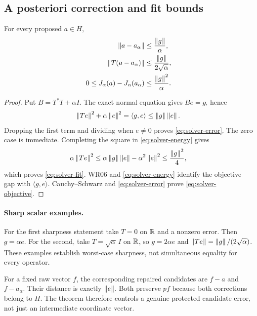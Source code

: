 \subsection{A posteriori correction and fit bounds}
\begin{theorem}\label{WR13}
For every proposed $a\in H$,
\begin{align}
 \left\lVert a-a_\alpha\right\rVert&\le\frac{\left\lVert g\right\rVert}{\alpha},\label{eq:solver-error}\\
 \left\lVert T(a-a_\alpha)\right\rVert&\le\frac{\left\lVert g\right\rVert}{2\sqrt\alpha},\label{eq:solver-fit}\\
 0\le J_\alpha(a)-J_\alpha(a_\alpha)&\le\frac{\left\lVert g\right\rVert^2}{\alpha}.
 \label{eq:solver-objective}
\end{align}
\end{theorem}
\begin{proof}
Put $B=T^*T+\alpha I$. The exact normal equation gives $Be=g$, hence
\begin{equation}\label{eq:solver-energy}
 \left\lVert Te\right\rVert^2+\alpha\left\lVert e\right\rVert^2=\langle g,e\rangle\le\left\lVert g\right\rVert\left\lVert e\right\rVert.
\end{equation}
Dropping the first term and dividing when $e\ne0$ proves \eqref{eq:solver-error}. The zero case is immediate. Completing the square in \eqref{eq:solver-energy} gives
\[
 \alpha\left\lVert Te\right\rVert^2
 \le \alpha\left\lVert g\right\rVert\left\lVert e\right\rVert-\alpha^2\left\lVert e\right\rVert^2
 \le\frac{\left\lVert g\right\rVert^2}{4},
\]
which proves \eqref{eq:solver-fit}. WR06 and \eqref{eq:solver-energy} identify the objective gap with $\langle g,e\rangle$. Cauchy--Schwarz and \eqref{eq:solver-error} prove \eqref{eq:solver-objective}.

\end{proof}

\paragraph{Sharp scalar examples.} For the first sharpness statement take $T=0$ on $\mathbb R$ and a nonzero error. Then $g=\alpha e$. For the second, take $T=\sqrt\alpha\,I$ on $\mathbb R$, so $g=2\alpha e$ and $\left\lVert Te\right\rVert=\left\lVert g\right\rVert/(2\sqrt\alpha)$. These examples establish worst-case sharpness, not simultaneous equality for every operator.

For a fixed raw vector $f$, the corresponding repaired candidates are $f-a$ and $f-a_\alpha$. Their distance is exactly $\left\lVert e\right\rVert$. Both preserve $pf$ because both corrections belong to $H$. The theorem therefore controls a genuine protected candidate error, not just an intermediate coordinate vector.

